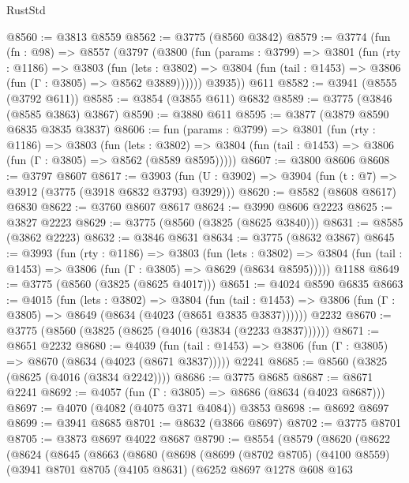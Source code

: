\begin{lexlean}{RustStd}
\begin{coremodule}
@8560 := @3813 @8559
@8562 := @3775 (@8560 @3842)
@8579 := @3774
    (fun (fn : @98) =>
    @8557
      (@3797
        (@3800
          (fun (params : @3799) =>
          @3801
            (fun (rty : @1186) =>
            @3803
              (fun (lets : @3802) =>
              @3804 (fun (tail : @1453) => @3806 (fun (Γ : @3805) => @8562 @3889))))))
        @3935))
    @611
@8582 := @3941 (@8555 (@3792 @611))
@8585 := @3854 (@3855 @611) @6832
@8589 := @3775 (@3846 (@8585 @3863) @3867)
@8590 := @3880 @611
@8595 := @3877 (@3879 @8590 @6835 @3835 @3837)
@8606 := fun (params : @3799) =>
  @3801
    (fun (rty : @1186) =>
    @3803
      (fun (lets : @3802) =>
      @3804 (fun (tail : @1453) => @3806 (fun (Γ : @3805) => @8562 (@8589 @8595)))))
@8607 := @3800 @8606
@8608 := @3797 @8607
@8617 := @3903 (fun (U : @3902) => @3904 (fun (t : @7) => @3912 (@3775 (@3918 @6832 @3793) @3929)))
@8620 := @8582 (@8608 @8617) @6830
@8622 := @3760 @8607 @8617
@8624 := @3990 @8606 @2223
@8625 := @3827 @2223
@8629 := @3775 (@8560 (@3825 (@8625 @3840)))
@8631 := @8585 (@3862 @2223)
@8632 := @3846 @8631
@8634 := @3775 (@8632 @3867)
@8645 := @3993
    (fun (rty : @1186) =>
    @3803
      (fun (lets : @3802) =>
      @3804 (fun (tail : @1453) => @3806 (fun (Γ : @3805) => @8629 (@8634 @8595)))))
    @1188
@8649 := @3775 (@8560 (@3825 (@8625 @4017)))
@8651 := @4024 @8590 @6835
@8663 := @4015
    (fun (lets : @3802) =>
    @3804
      (fun (tail : @1453) => @3806 (fun (Γ : @3805) => @8649 (@8634 (@4023 (@8651 @3835 @3837))))))
    @2232
@8670 := @3775 (@8560 (@3825 (@8625 (@4016 (@3834 (@2233 @3837))))))
@8671 := @8651 @2232
@8680 := @4039
    (fun (tail : @1453) => @3806 (fun (Γ : @3805) => @8670 (@8634 (@4023 (@8671 @3837)))))
    @2241
@8685 := @8560 (@3825 (@8625 (@4016 (@3834 @2242))))
@8686 := @3775 @8685
@8687 := @8671 @2241
@8692 := @4057 (fun (Γ : @3805) => @8686 (@8634 (@4023 @8687)))
@8697 := @4070 (@4082 (@4075 @371 @4084)) @3853
@8698 := @8692 @8697
@8699 := @3941 @8685
@8701 := @8632 (@3866 @8697)
@8702 := @3775 @8701
@8705 := @3873 @8697 @4022 @8687
@8790 := @8554
    (@8579
      (@8620
        (@8622
          (@8624
            (@8645
              (@8663
                (@8680
                  (@8698
                    (@8699
                      (@8702 @8705)
                      (@4100 @8559)
                      (@3941
                        @8701
                        @8705
                        (@4105 @8631)
                        (@6252
                          @8697
                          @1278
                          @608
                          @163

\end{coremodule}
\end{lexlean}
